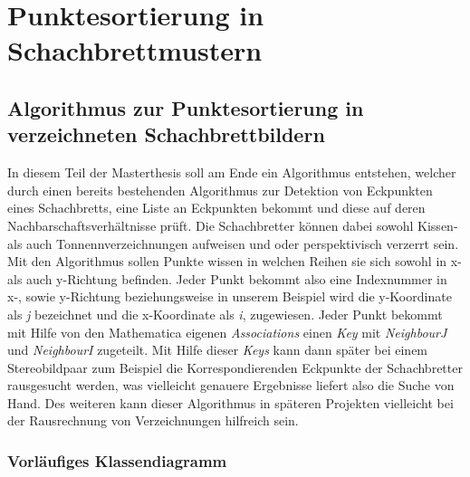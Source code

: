 \chapter{Punktesortierung in Schachbrettmustern}
\label{sec:schachbrettAlg} 

\section{Algorithmus zur Punktesortierung in verzeichneten Schachbrettbildern}

In diesem Teil der Masterthesis soll am Ende ein Algorithmus entstehen, welcher durch einen bereits bestehenden Algorithmus zur Detektion von Eckpunkten eines Schachbretts, eine Liste an Eckpunkten bekommt und diese auf deren Nachbarschaftsverhältnisse prüft. Die Schachbretter können dabei sowohl Kissen- als auch Tonnennverzeichnungen aufweisen und oder perspektivisch verzerrt sein. Mit den Algorithmus sollen Punkte wissen in welchen Reihen sie sich sowohl in x- als auch y-Richtung befinden. Jeder Punkt bekommt also eine Indexnummer in x-, sowie y-Richtung beziehungsweise in unserem Beispiel wird die y-Koordinate als \textit{j} bezeichnet und die x-Koordinate als \textit{i}, zugewiesen. Jeder Punkt bekommt mit Hilfe von den Mathematica eigenen \textit{Associations} einen \textit{Key} mit \textit{NeighbourJ} und \textit{NeighbourI} zugeteilt. Mit Hilfe dieser \textit{Keys} kann dann später bei einem Stereobildpaar zum Beispiel die Korrespondierenden Eckpunkte der Schachbretter rausgesucht werden, was vielleicht genauere Ergebnisse liefert also die Suche von Hand. Des weiteren kann dieser Algorithmus in späteren Projekten vielleicht bei der Rausrechnung von Verzeichnungen hilfreich sein.\\

\subsection{Vorläufiges Klassendiagramm}

